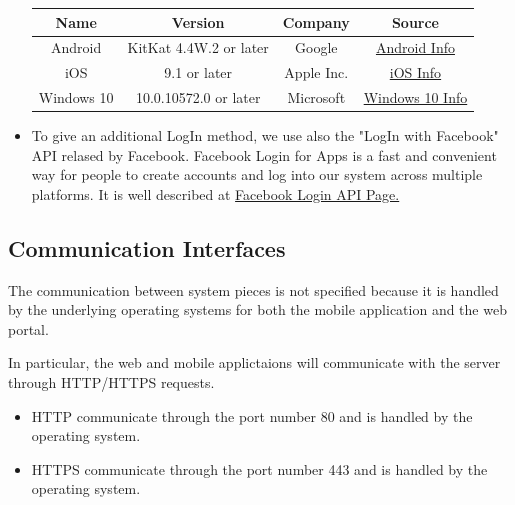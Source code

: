 \begin{itemize}
\begin{center}
\begin{table}[h!]
\begin{center}
								\begin{tabular}{cccc}
									\toprule
									\textbf{Name} & \textbf{Version} & \textbf{Company} & \textbf{Source}\\
									\midrule
									Android & KitKat 4.4W.2 or later & Google & \href{https://www.android.com}{Android Info}\\
									\midrule
									iOS & 9.1 or later & Apple Inc. & \href{http://www.apple.com/ios/}{iOS Info}\\
									\midrule
									Windows 10 & 10.0.10572.0 or later & Microsoft & \href{http://www.microsoft.com/it-it/mobile/windows10/?dcmpid=omc-org-globalsite.globalredirect}{Windows 10 Info}\\
									\bottomrule
								\end{tabular}
							\end{center}
							
						\end{table}
					\end{center}

				\item To give an additional LogIn method, we use also the "LogIn with Facebook" API relased by Facebook. Facebook Login for Apps is a fast and convenient way for people to create accounts and log into our system across multiple platforms. It is well described at \href{https://developers.facebook.com/docs/facebook-login}{Facebook Login API Page.}
			\end{itemize}


		\subsection{Communication Interfaces}
		The communication between system pieces is not specified because it is handled by the underlying operating systems for both the mobile application and the web portal.

		In particular, the web and mobile applictaions will communicate with the server through HTTP/HTTPS requests. 

			\begin{itemize}
				\item HTTP communicate through the port number 80 and is handled by the operating system. 
				\item HTTPS communicate through the port number 443 and is handled by the operating system.
			\end{itemize}